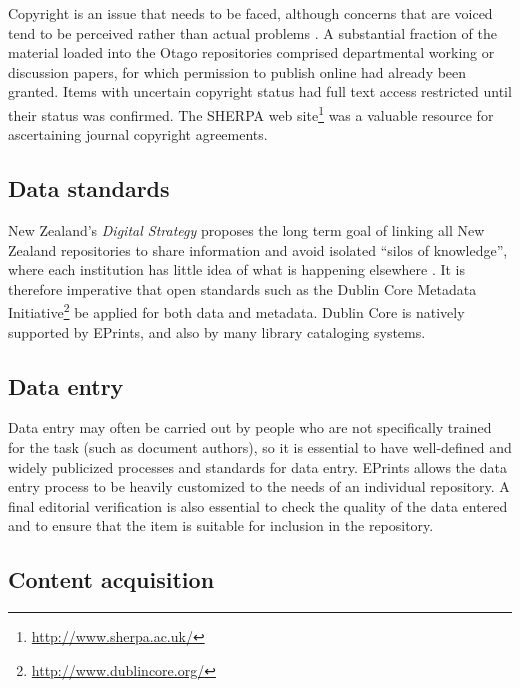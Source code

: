 \documentclass[12pt,pdftex,a4paper,titlepage]{article}
\begin{document}
Copyright is an issue that needs to be faced, although concerns that are voiced tend to be perceived rather than actual problems \cite{EPri-O-2005-SelfFAQ,Sale-A-2006-OAchapter}. A substantial fraction of the material loaded into the Otago repositories comprised departmental working or discussion papers, for which permission to publish online had already been granted. Items with uncertain copyright status had full text access restricted until their status was confirmed. The SHERPA web site\footnote{\url{http://www.sherpa.ac.uk/}} was a valuable resource for ascertaining journal copyright agreements.


\subsection{Data standards}

New Zealand's \emph{Digital Strategy} proposes the long term goal of linking all New Zealand repositories to share information and avoid isolated ``silos of knowledge'', where each institution has little idea of what is happening elsewhere \cite{NZG-2005-digital_strategy}. It is therefore imperative that open standards such as the Dublin Core Metadata Initiative\footnote{\url{http://www.dublincore.org/}} be applied for both data and metadata. Dublin Core is natively supported by EPrints, and also by many library cataloging systems.


\subsection{Data entry}

Data entry may often be carried out by people who are not specifically trained for the task (such as document authors), so it is essential to have well-defined and widely publicized processes and standards for data entry. EPrints allows the data entry process to be heavily customized to the needs of an individual repository. A final editorial verification is also essential to check the quality of the data entered and to ensure that the item is suitable for inclusion in the repository.


\subsection{Content acquisition}
\label{sec-content}
\end{document}
